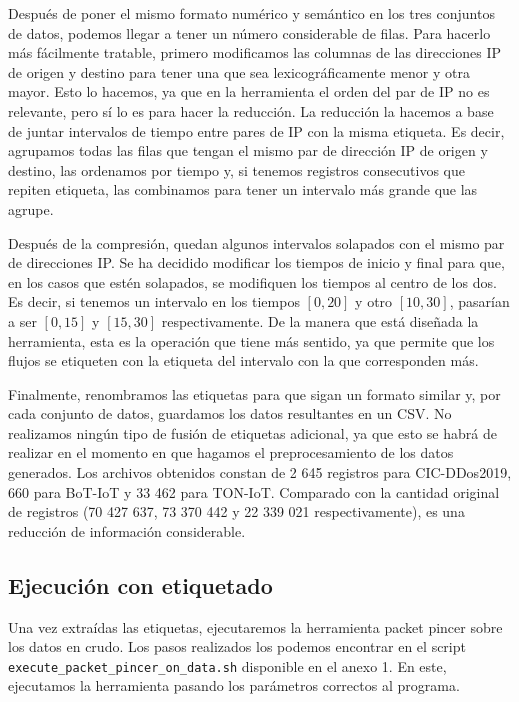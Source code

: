Después de poner el mismo formato numérico y semántico en los tres conjuntos de datos, podemos llegar a tener un número considerable de filas. Para hacerlo más fácilmente tratable, primero modificamos las columnas de las direcciones IP de origen y destino para tener una que sea lexicográficamente menor y otra mayor. Esto lo hacemos, ya que en la herramienta el orden del par de IP no es relevante, pero sí lo es para hacer la reducción. La reducción la hacemos a base de juntar intervalos de tiempo entre pares de IP con la misma etiqueta. Es decir, agrupamos todas las filas que tengan el mismo par de dirección IP de origen y destino, las ordenamos por tiempo y, si tenemos registros consecutivos que repiten etiqueta, las combinamos para tener un intervalo más grande que las agrupe.

Después de la compresión, quedan algunos intervalos solapados con el mismo par de direcciones IP. Se ha decidido modificar los tiempos de inicio y final para que, en los casos que estén solapados, se modifiquen los tiempos al centro de los dos. Es decir, si tenemos un intervalo en los tiempos $[0, 20]$ y otro $[10, 30]$, pasarían a ser $[0, 15]$ y $[15, 30]$ respectivamente. De la manera que está diseñada la herramienta, esta es la operación que tiene más sentido, ya que permite que los flujos se etiqueten con la etiqueta del intervalo con la que corresponden más.

Finalmente, renombramos las etiquetas para que sigan un formato similar y, por cada conjunto de datos, guardamos los datos resultantes en un CSV. No realizamos ningún tipo de fusión de etiquetas adicional, ya que esto se habrá de realizar en el momento en que hagamos el preprocesamiento de los datos generados. Los archivos obtenidos constan de 2 645 registros para CIC-DDos2019, 660 para BoT-IoT y 33 462 para TON-IoT. Comparado con la cantidad original de registros (70 427 637, 73 370 442 y 22 339 021 respectivamente), es una reducción de información considerable.

\subsection{Ejecución con etiquetado}

Una vez extraídas las etiquetas, ejecutaremos la herramienta packet pincer sobre los datos en crudo. Los pasos realizados los podemos encontrar en el script \texttt{execute\-\_packet\-\_pincer\-\_on\-\_data.sh} disponible en el anexo 1. En este, ejecutamos la herramienta pasando los parámetros correctos al programa.

